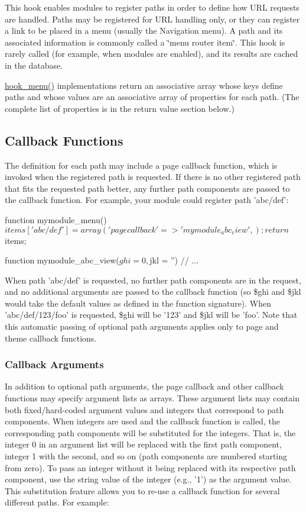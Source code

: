 This hook enables modules to register paths in order to define how URL requests are handled. Paths may be registered for URL handling only, or they can register a link to be placed in a menu (usually the Navigation menu). A path and its associated information is commonly called a \char`\"{}menu router item\char`\"{}. This hook is rarely called (for example, when modules are enabled), and its results are cached in the database.

\hyperlink{group__hooks_ga5c95244fea59b25666e409759e133ded}{hook\_\-menu()} implementations return an associative array whose keys define paths and whose values are an associative array of properties for each path. (The complete list of properties is in the return value section below.)\hypertarget{group__hooks_sec_callback_funcs}{}\subsection{Callback Functions}\label{group__hooks_sec_callback_funcs}
The definition for each path may include a page callback function, which is invoked when the registered path is requested. If there is no other registered path that fits the requested path better, any further path components are passed to the callback function. For example, your module could register path 'abc/def': 
\begin{DoxyCode}
   function mymodule_menu() {
     $items['abc/def'] = array(
       'page callback' => 'mymodule_abc_view',
     );
     return $items;
   }

   function mymodule_abc_view($ghi = 0, $jkl = '') {
     // ...
   }
\end{DoxyCode}
 When path 'abc/def' is requested, no further path components are in the request, and no additional arguments are passed to the callback function (so \$ghi and \$jkl would take the default values as defined in the function signature). When 'abc/def/123/foo' is requested, \$ghi will be '123' and \$jkl will be 'foo'. Note that this automatic passing of optional path arguments applies only to page and theme callback functions.\hypertarget{group__hooks_sub_callback_arguments}{}\subsubsection{Callback Arguments}\label{group__hooks_sub_callback_arguments}
In addition to optional path arguments, the page callback and other callback functions may specify argument lists as arrays. These argument lists may contain both fixed/hard-\/coded argument values and integers that correspond to path components. When integers are used and the callback function is called, the corresponding path components will be substituted for the integers. That is, the integer 0 in an argument list will be replaced with the first path component, integer 1 with the second, and so on (path components are numbered starting from zero). To pass an integer without it being replaced with its respective path component, use the string value of the integer (e.g., '1') as the argument value. This substitution feature allows you to re-\/use a callback function for several different paths. For example: 
